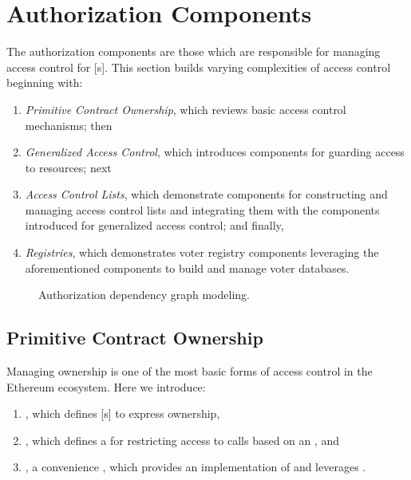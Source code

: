\section{Authorization Components}

The authorization components are those which are responsible for managing access
control for [s]. This section builds varying complexities of
access control beginning with:

\begin{enumerate}
  \item \emph{Primitive Contract Ownership}, which reviews basic access control
    mechanisms; then

  \item \emph{Generalized Access Control}, which introduces components for
    guarding access to resources; next

  \item \emph{Access Control Lists}, which demonstrate components for
    constructing and managing access control lists and integrating them with the
    components introduced for generalized access control; and finally,

  \item \emph{Registries}, which demonstrates voter registry components
    leveraging the aforementioned components to build and manage voter
    databases.
\end{enumerate}

\begin{figure}[H]
  \centering
  \caption{Authorization dependency graph modeling.}%
\end{figure}

\subsection{Primitive Contract Ownership}

Managing  ownership is one of the most basic forms of access
control in the Ethereum ecosystem. Here we introduce:

\begin{enumerate}
  \item {}, which defines [s] to
    express  ownership,
  \item {}, which defines a  for
    restricting access to  calls based on an , and
  \item {}, a convenience , which provides an
    implementation of  and leverages
    .
\end{enumerate}

